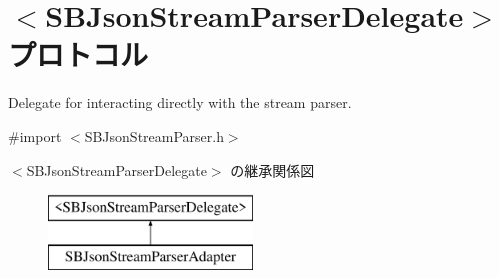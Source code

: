 \hypertarget{protocol_s_b_json_stream_parser_delegate-p}{}\section{$<$S\+B\+Json\+Stream\+Parser\+Delegate$>$ プロトコル}
\label{protocol_s_b_json_stream_parser_delegate-p}


Delegate for interacting directly with the stream parser.  




{\ttfamily \#import $<$S\+B\+Json\+Stream\+Parser.\+h$>$}

$<$S\+B\+Json\+Stream\+Parser\+Delegate$>$ の継承関係図\begin{figure}[H]
\begin{center}
\leavevmode
\includegraphics[height=2.000000cm]{protocol_s_b_json_stream_parser_delegate-p}
\end{center}
\end{figure}
